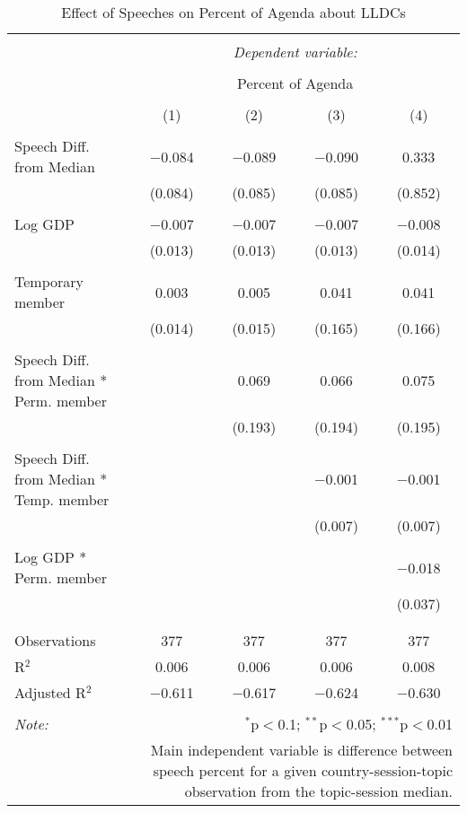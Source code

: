 
\begin{table}[!htbp] \centering 
  \caption{Effect of Speeches on Percent of Agenda about LLDCs} 
  \label{} 
\begin{tabular}{@{\extracolsep{5pt}}lcccc} 
\\[-1.8ex]\hline 
\hline \\[-1.8ex] 
 & \multicolumn{4}{c}{\textit{Dependent variable:}} \\ 
\cline{2-5} 
\\[-1.8ex] & \multicolumn{4}{c}{Percent of Agenda} \\ 
\\[-1.8ex] & (1) & (2) & (3) & (4)\\ 
\hline \\[-1.8ex] 
 Speech Diff. from Median & $-$0.084 & $-$0.089 & $-$0.090 & 0.333 \\ 
  & (0.084) & (0.085) & (0.085) & (0.852) \\ 
  & & & & \\ 
 Log GDP & $-$0.007 & $-$0.007 & $-$0.007 & $-$0.008 \\ 
  & (0.013) & (0.013) & (0.013) & (0.014) \\ 
  & & & & \\ 
 Temporary member & 0.003 & 0.005 & 0.041 & 0.041 \\ 
  & (0.014) & (0.015) & (0.165) & (0.166) \\ 
  & & & & \\ 
 Speech Diff. from Median * Perm. member &  & 0.069 & 0.066 & 0.075 \\ 
  &  & (0.193) & (0.194) & (0.195) \\ 
  & & & & \\ 
 Speech Diff. from Median * Temp. member &  &  & $-$0.001 & $-$0.001 \\ 
  &  &  & (0.007) & (0.007) \\ 
  & & & & \\ 
 Log GDP * Perm. member &  &  &  & $-$0.018 \\ 
  &  &  &  & (0.037) \\ 
  & & & & \\ 
\hline \\[-1.8ex] 
Observations & 377 & 377 & 377 & 377 \\ 
R$^{2}$ & 0.006 & 0.006 & 0.006 & 0.008 \\ 
Adjusted R$^{2}$ & $-$0.611 & $-$0.617 & $-$0.624 & $-$0.630 \\ 
\hline 
\hline \\[-1.8ex] 
\textit{Note:}  & \multicolumn{4}{r}{$^{*}$p$<$0.1; $^{**}$p$<$0.05; $^{***}$p$<$0.01} \\ 
 & \multicolumn{4}{r}{Main independent variable is difference between speech percent for a given country-session-topic observation from the topic-session median.} \\ 
\end{tabular} 
\end{table} 
